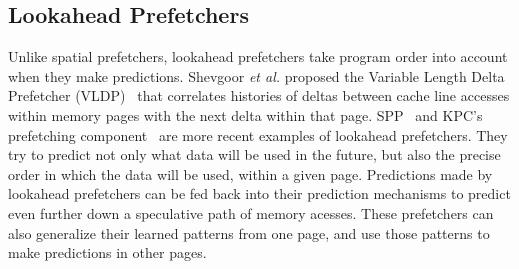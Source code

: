 

\subsection{Lookahead Prefetchers}

Unlike spatial prefetchers, lookahead prefetchers take program order into
account when they make predictions. Shevgoor \textit{et al.} proposed the Variable 
Length Delta Prefetcher (VLDP)~\cite{VLDP} that correlates histories of
deltas between cache line accesses within memory pages with the next delta
within that page. SPP~\cite{SPP} and KPC's prefetching component~\cite{KPC} are
more recent examples of lookahead prefetchers. They try to predict not only what
data will be used in the future, but also the precise order in which the data
will be used, within a given page. Predictions made by lookahead prefetchers can
be fed back into their prediction mechanisms to predict even further down 
a speculative path of memory acesses. These prefetchers can also generalize their
learned patterns from one page, and use those patterns to make predictions in 
other pages.


